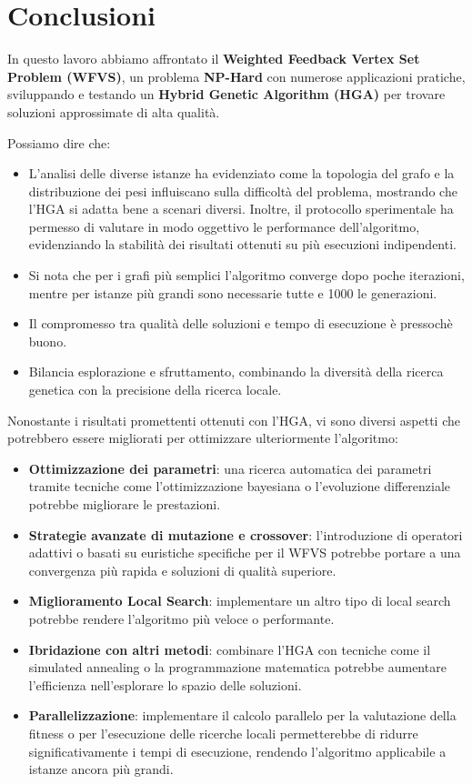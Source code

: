 \documentclass[a4paper,12pt]{article}
\begin{document}
\section{Conclusioni}
In questo lavoro abbiamo affrontato il \textbf{Weighted Feedback Vertex Set Problem (WFVS)}, un problema \textbf{NP-Hard} con numerose applicazioni pratiche, sviluppando e testando un \textbf{Hybrid Genetic Algorithm (HGA)} per trovare soluzioni approssimate di alta qualità.

Possiamo dire che:
\begin{itemize}
    \item L'analisi delle diverse istanze ha evidenziato come la topologia del grafo e la distribuzione dei pesi influiscano sulla difficoltà del problema, mostrando che l'HGA si adatta bene a scenari diversi. Inoltre, il protocollo sperimentale ha permesso di valutare in modo oggettivo le performance dell'algoritmo, evidenziando la stabilità dei risultati ottenuti su più esecuzioni indipendenti.
    \item Si nota che per i grafi più semplici l'algoritmo converge dopo poche iterazioni, mentre per istanze più grandi sono necessarie tutte e 1000 le generazioni.
    \item Il compromesso tra qualità delle soluzioni e tempo di esecuzione è pressochè buono.
    \item Bilancia esplorazione e sfruttamento, combinando la diversità della ricerca genetica con la precisione della ricerca locale.
\end{itemize}

Nonostante i risultati promettenti ottenuti con l'HGA, vi sono diversi aspetti che potrebbero essere migliorati per ottimizzare ulteriormente l'algoritmo:
\begin{itemize}
    \item \textbf{Ottimizzazione dei parametri}: una ricerca automatica dei parametri tramite tecniche come l'ottimizzazione bayesiana o l'evoluzione differenziale potrebbe migliorare le prestazioni.
    \item \textbf{Strategie avanzate di mutazione e crossover}: l'introduzione di operatori adattivi o basati su euristiche specifiche per il WFVS potrebbe portare a una convergenza più rapida e soluzioni di qualità superiore.
    \item \textbf{Miglioramento Local Search}: implementare un altro tipo di local search potrebbe rendere l'algoritmo più veloce o performante.
    \item \textbf{Ibridazione con altri metodi}: combinare l'HGA con tecniche come il simulated annealing o la programmazione matematica potrebbe aumentare l'efficienza nell'esplorare lo spazio delle soluzioni.
    \item \textbf{Parallelizzazione}: implementare il calcolo parallelo per la valutazione della fitness o per l'esecuzione delle ricerche locali permetterebbe di ridurre significativamente i tempi di esecuzione, rendendo l'algoritmo applicabile a istanze ancora più grandi.
\end{itemize}
\end{document}
